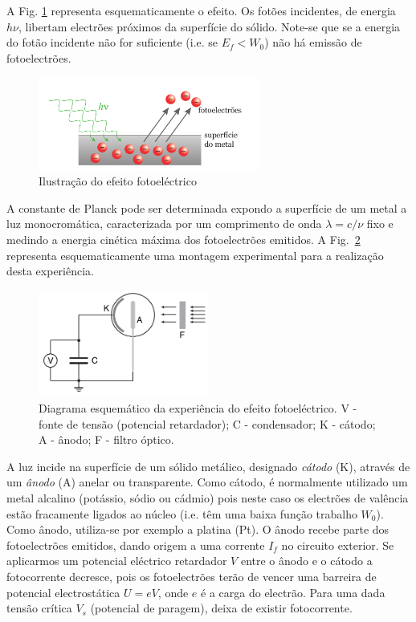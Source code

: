 \documentclass[a4paper,twoside,11pt]{report}      %
\begin{document}
A Fig. \ref{fig:pe-effect} representa esquematicamente o efeito. Os fotões incidentes, de energia $h\nu$, libertam electrões próximos da superfície do sólido. Note-se que se a energia do fotão incidente não for suficiente (i.e. se $E_f < W_0$) não há emissão de fotoelectrões.

\begin{figure}[htb] 
	\centering 
	\includegraphics[width=0.65\textwidth]{pe-effect.pdf}
	\caption{Ilustração do efeito fotoeléctrico} \label{fig:pe-effect}
\end{figure}

A constante de Planck pode ser determinada expondo a superfície de um metal a luz monocromática, caracterizada por um comprimento de onda $\lambda=c /\nu$ fixo e medindo a energia cinética máxima dos fotoelectrões emitidos. A Fig.~\ref{fig:plack_exp} representa esquematicamente uma montagem experimental para a realização desta experiência.

\begin{figure}[htb] 
	\centering 
	\includegraphics[width=0.5\textwidth]{planck_exp.pdf}
	\caption{Diagrama esquemático da experiência do efeito fotoeléctrico. V - fonte de tensão (potencial retardador); C - condensador; K - cátodo; A - ânodo; F - filtro óptico.} \label{fig:plack_exp}
\end{figure}
A luz incide na superfície de um sólido metálico, designado \emph{cátodo} (K), através de um \emph{ânodo} (A) anelar ou transparente. 
Como cátodo, é normalmente utilizado um metal alcalino (potássio, sódio ou cádmio)  pois neste caso os electrões de valência estão fracamente 
ligados ao núcleo (i.e. têm uma baixa função trabalho $W_0$). Como ânodo, utiliza-se por exemplo a platina (Pt). 
O ânodo recebe parte dos fotoelectrões emitidos, dando origem a uma corrente $I_f$ no circuito exterior. 
Se aplicarmos um potencial eléctrico retardador $V$ entre o ânodo e o cátodo a fotocorrente decresce, pois os fotoelectrões terão de vencer uma barreira de potencial electrostática $U=e V$, onde $e$ é a carga do electrão. 
Para uma dada tensão crítica $V_s$ (potencial de paragem), deixa de existir fotocorrente. 
\end{document}
